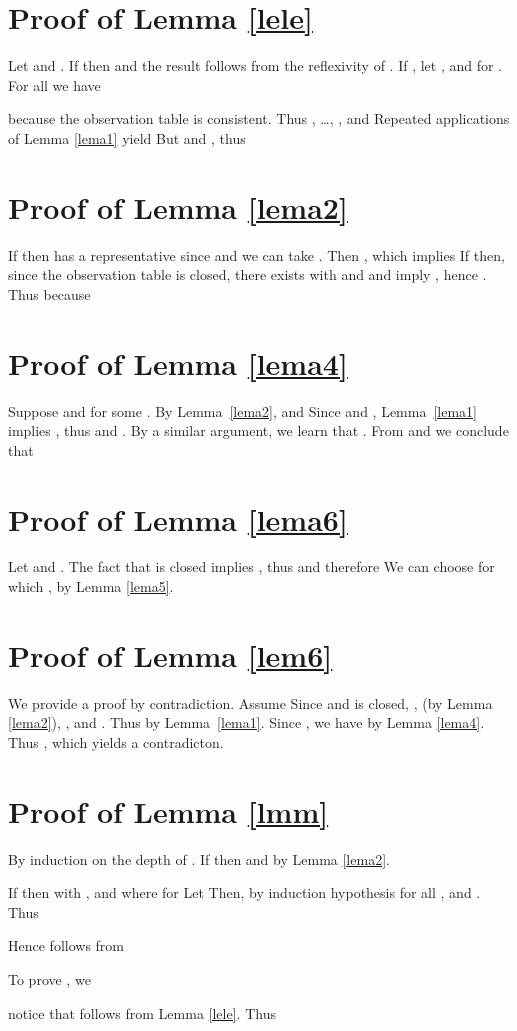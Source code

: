 \documentclass[preprint,12pt,english]{article}
\newcommand\comment[1]{}
\begin{document}
\section{Proof of Lemma \ref{lele}}
Let  and . 
If  then  and the result follows from the reflexivity of . 
If , let , and  for .
For all  we have

because the observation table  is consistent. Thus , \ldots, , and  Repeated applications of Lemma \ref{lema1} yield  But  and , thus 
\section{Proof of Lemma \ref{lema2}}
If  then  has a representative since  and we can take . Then , which implies  If  then, since the observation table is closed, there exists  with  and   and  imply , hence . Thus  because  
\section{Proof of Lemma \ref{lema4}}
Suppose  and  for some . By Lemma~\ref{lema2},  and  
Since  and , Lemma~\ref{lema1} implies , thus  and . By a similar argument, we learn that . From  and  we conclude that  
\section{Proof of Lemma \ref{lema6}}
Let  and . The fact that  is closed implies , thus  and therefore  We can choose  for which , by Lemma \ref{lema5}. 
\section{Proof of Lemma \ref{lem6}}
We provide a proof by contradiction. Assume 
Since  and  is closed, ,   (by Lemma \ref{lema2}),  , and . Thus  by Lemma~\ref{lema1}.
Since , we have  by Lemma \ref{lema4}. Thus , which yields a contradicton. 

\section{Proof of Lemma \ref{lmm}}
By induction on the depth of . If  then  and  by Lemma \ref{lema2}. 

If  then  with , and  where  for  Let  Then, by induction hypothesis for all ,  and . 
Thus

Hence  follows from  

To prove  , we 
\comment{reason as follows. Suppose , and 
let , and  for . 
For all  we have

because the observation table  is consistent. Also,  whenever  because, by induction hypothesis,  for all . Hence  by repeated applications of Lemma~\ref{lema1}. }
notice that  follows from Lemma \ref{lele}.
Thus
\end{document}
